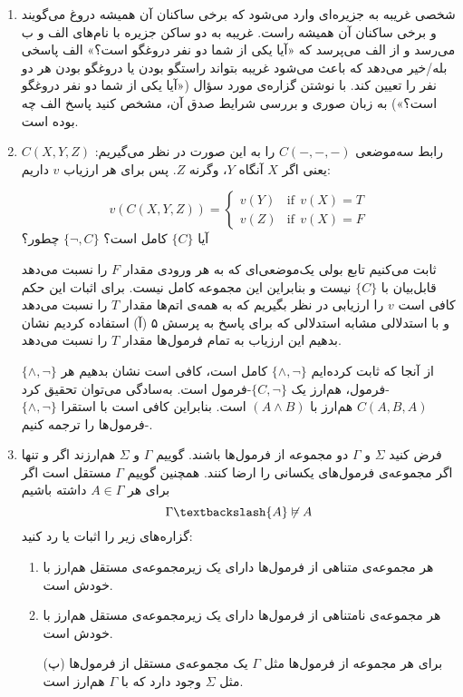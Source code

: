 \documentclass[12pt, 14paper]{article}
\begin{document}
\begin{enumerate}
\begin{ans}
\begin{enumerate}
  \end{enumerate}
\end{ans}

\item
شخصی غریبه به جزیره‌ای وارد می‌شود که برخی ساکنان آن همیشه دروغ می‌گویند و برخی ساکنان آن همیشه راست. غریبه به دو ساکن جزیره با نام‌های الف و ب می‌رسد و از الف می‌پرسد که «آیا یکی از شما دو نفر دروغگو است؟» الف پاسخی بله/خیر می‌دهد که باعث می‌شود غریبه بتواند راستگو بودن یا دروغگو بودن هر دو نفر را تعیین کند. با نوشتن گزاره‌ی مورد سؤال («آیا یکی از شما دو نفر دروغگو است؟») به زبان صوری و بررسی شرایط صدق آن، مشخص کنید پاسخ الف چه بوده است.

\item
رابط سه‌موضعی $C(-,-,-)$ را به این صورت در نظر می‌گیریم: $C(X,Y,Z)$ یعنی اگر $X$ آنگاه $Y$، وگرنه $Z$. پس برای هر ارزیاب $v$ داریم:

$$
v(C(X,Y,Z))=
\begin{cases}
v(Y) & \text{if}~~v(X)=T\\
v(Z) & \text{if}~~v(X)=F
\end{cases}
$$
آیا $\{C\}$ کامل است؟ $\{\neg, C\}$ چطور؟
\begin{ans}
  ثابت می‌کنیم تابع بولی یک‌موضعی‌ای که به هر ورودی مقدار $F$ را نسبت می‌دهد قابل‌بیان با $\{C\}$ نیست و بنابراین این مجموعه کامل نیست. برای اثبات این حکم کافی است $v$ را ارزیابی در نظر بگیریم که به همه‌ی اتم‌ها مقدار $T$ را نسبت می‌دهد و با استدلالی مشابه استدلالی که برای پاسخ به پرسش ۵ (آ) استفاده کردیم نشان بدهیم این ارزیاب به تمام فرمول‌ها مقدار $T$ را نسبت می‌دهد.

  از آنجا که ثابت کرده‌ایم
  $\{\wedge,\neg\}$
  کامل است، کافی است نشان بدهیم هر $\{\wedge,\neg\}$-فرمول، هم‌ارز یک $\{C,\neg\}$-فرمول است. به‌سادگی می‌توان تحقیق کرد
  $C(A,B,A)$
  هم‌ارز با
  $(A\wedge B)$
  است. بنابراین کافی است با استقرا $\{\wedge,\neg\}$-فرمول‌ها را ترجمه کنیم.
\end{ans}

\item
فرض کنید $\Sigma$ و $\Gamma$ دو مجموعه از فرمول‌ها باشند. گوییم $\Gamma$ و $\Sigma$ هم‌ارزند اگر و تنها اگر مجموعه‌ی فرمول‌های یکسانی را ارضا کنند. همچنین گوییم $\Gamma$ مستقل است اگر برای هر $A\in\Gamma$ داشته باشیم
$$
\Gamma\textbackslash\{A\}\not\vDash A
$$
گزاره‌های زیر را اثبات یا رد کنید:
\begin{enumerate}
\item
هر مجموعه‌ی متناهی از فرمول‌ها دارای یک زیرمجموعه‌ی مستقل هم‌ارز با خودش است.
\item
هر مجموعه‌ی نامتناهی از فرمول‌ها دارای یک زیرمجموعه‌ی مستقل هم‌ارز با خودش است.
\item[(پ)]
برای هر مجموعه از فرمول‌ها مثل $\Gamma$ یک مجموعه‌ی مستقل از فرمول‌ها مثل $\Sigma$ وجود دارد که با $\Gamma$ هم‌ارز است.
\end{enumerate}


\end{enumerate}
\end{document}

